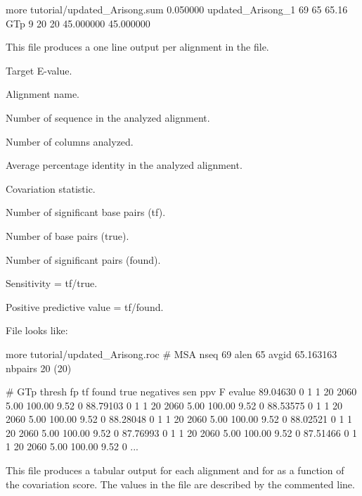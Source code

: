 \begin{sreoutput}
more tutorial/updated_Arisong.sum 
0.050000        updated_Arisong_1       69      65      65.16    GTp 9 20 20 45.000000 45.000000 
\end{sreoutput}
This file produces a one line output per alignment in the file.
\begin{sreitems}{}
\item[\prog{Column 1}] Target E-value.
\item[\prog{Column 2}] Alignment name.
\item[\prog{Column 3}] Number of sequence in the analyzed alignment.
\item[\prog{Column 4}] Number of columns analyzed.
\item[\prog{Column 5}] Average percentage identity in the analyzed alignment.
\item[\prog{Column 6}] Covariation statistic.
\item[\prog{Column 7}] Number of significant base pairs (tf).
\item[\prog{Column 8}] Number of base pairs (true).
\item[\prog{Column 9}] Number of significant pairs (found).
\item[\prog{Column 10}] Sensitivity = tf/true.
\item[\prog{Column 11}] Positive predictive value = tf/found.

\end{sreitems}

File  looks like:
\begin{sreoutput}
more tutorial/updated_Arisong.roc
# MSA nseq 69 alen 65 avgid 65.163163 nbpairs 20 (20)

# GTp thresh fp tf found true negatives sen ppv F evalue
89.04630 0 1 1 20 2060 5.00 100.00 9.52 0
88.79103 0 1 1 20 2060 5.00 100.00 9.52 0
88.53575 0 1 1 20 2060 5.00 100.00 9.52 0
88.28048 0 1 1 20 2060 5.00 100.00 9.52 0
88.02521 0 1 1 20 2060 5.00 100.00 9.52 0
87.76993 0 1 1 20 2060 5.00 100.00 9.52 0
87.51466 0 1 1 20 2060 5.00 100.00 9.52 0
...
\end{sreoutput}

This file produces a tabular output for each alignment and for as a
function of the covariation score. The values in the file are
described by the commented line.
